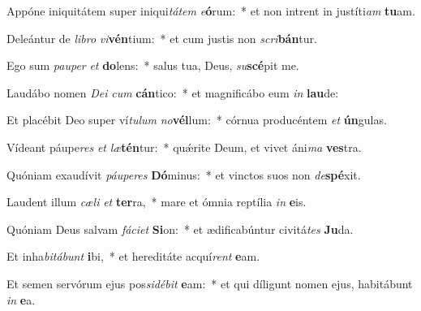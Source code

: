\item Appóne iniquitátem super iniqui\textit{tá}\textit{tem} \textit{e}\textbf{ó}rum:~* et non intrent in justíti\textit{am} \textbf{tu}am.
\item Deleántur de \textit{li}\textit{bro} \textit{vi}\textbf{vén}tium:~* et cum justis non \textit{scri}\textbf{bán}tur.
\item Ego sum \textit{pau}\textit{per} \textit{et} \textbf{do}lens:~* salus tua, Deus, \textit{su}\textbf{scé}pit me.
\item Laudábo nomen \textit{De}\textit{i} \textit{cum} \textbf{cán}tico:~* et magnificábo eum \textit{in} \textbf{lau}de:
\item Et placébit Deo super ví\textit{tu}\textit{lum} \textit{no}\textbf{vél}lum:~* córnua producéntem \textit{et} \textbf{ún}gulas.
\item Vídeant páupe\textit{res} \textit{et} \textit{læ}\textbf{tén}tur:~* quǽrite Deum, et vivet áni\textit{ma} \textbf{ves}tra.
\item Quóniam exaudívit \textit{páu}\textit{pe}\textit{res} \textbf{Dó}minus:~* et vinctos suos non \textit{de}\textbf{spé}xit.
\item Laudent illum \textit{cæ}\textit{li} \textit{et} \textbf{ter}ra,~* mare et ómnia reptília \textit{in} \textbf{e}is.
\item Quóniam Deus salvam \textit{fá}\textit{ci}\textit{et} \textbf{Si}on:~* et ædificabúntur civitá\textit{tes} \textbf{Ju}da.
\item Et inha\textit{bi}\textit{tá}\textit{bunt} \textbf{i}bi,~* et hereditáte acquí\textit{rent} \textbf{e}am.
\item Et semen servórum ejus pos\textit{si}\textit{dé}\textit{bit} \textbf{e}am:~* et qui díligunt nomen ejus, habitábunt \textit{in} \textbf{e}a.
